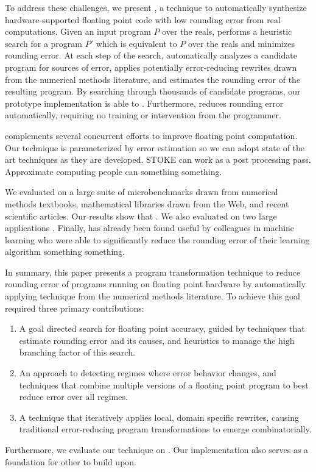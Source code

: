 \documentclass[paper.tex]{subfiles}
\begin{document}
To address these challenges, we present \casio, a technique to
automatically synthesize hardware-supported floating point code with
low rounding error  from real computations.  Given an
input program $P$ over the reals, \casio performs a heuristic search
for a program $P'$ which is equivalent to $P$ over the reals and
minimizes rounding error.  At each step of the search, \casio
automatically analyzes a candidate program for sources of error,
applies potentially error-reducing rewrites drawn from the numerical
methods literature, and estimates the rounding error of the resulting
program.  By searching through thousands of candidate programs, our
prototype implementation is able to .  Furthermore, \casio reduces rounding error
automatically, requiring no training or intervention from the
programmer.

\casio complements several concurrent efforts to improve floating
point computation.  Our technique is parameterized by error estimation
so we can adopt state of the art techniques as they are developed.
STOKE can work as a post processing pass.  Approximate computing
people can something something.

We evaluated \casio on a large suite of microbenchmarks drawn from
numerical methods textbooks, mathematical libraries drawn from the
Web, and recent scientific articles.  Our results show that \casio
{}.  We also evaluated \casio on two large applications
.  Finally, \casio has already been found useful by
colleagues in machine learning who were able to significantly reduce
the rounding error of their learning algorithm something something.

In summary, this paper presents a program transformation technique to
reduce rounding error of programs running on floating point hardware
by automatically applying technique from the numerical methods
literature.  To achieve this goal required three primary
contributions:
\begin{enumerate}
\item A goal directed search for floating point accuracy, guided by
  techniques that estimate rounding error and its causes,
  and heuristics to manage the high branching factor of this search.
\item An approach to detecting regimes where error behavior changes,
  and techniques that combine multiple versions of a floating point
  program to best reduce error over all regimes.
\item A technique that iteratively applies local, domain specific rewrites,
  causing traditional error-reducing program transformations
  to emerge combinatorially.
\end{enumerate}
Furthermore, we evaluate our technique on .  Our implementation also serves as a foundation for
other to build upon.
\end{document}

